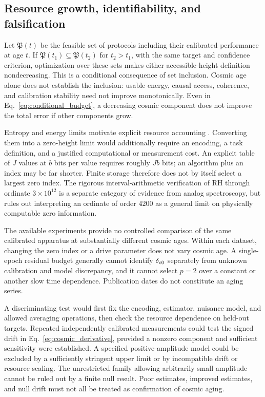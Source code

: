 \subsection{Resource growth, identifiability, and falsification}

Let $\mathfrak P(t)$ be the feasible set of protocols including their
calibrated performance at age $t$. If
$\mathfrak P(t_1)\subseteq\mathfrak P(t_2)$ for $t_2>t_1$, with the same
target and confidence criterion, optimization over these sets makes either
accessible-height definition nondecreasing. This is a conditional consequence
of set inclusion. Cosmic age alone does not establish the inclusion:
usable energy, causal access, coherence, and calibration stability need not
improve monotonically. Even in Eq.~\eqref{eq:conditional_budget}, a decreasing
cosmic component does not improve the total error if other components grow.

Entropy and energy limits motivate explicit resource accounting
\cite{Bekenstein1981,MargolusLevitin1998,Lloyd2002}. Converting them into a
zero-height limit would additionally require an encoding, a task definition,
and a justified computational or measurement cost. An explicit table of $J$
values at $b$ bits per value requires roughly $Jb$ bits; an algorithm plus an
index may be far shorter. Finite storage therefore does not by itself select
a largest zero index. The rigorous interval-arithmetic verification of RH
through ordinate $3\times10^{12}$ \cite{PlattTrudgian2021} is a separate
category of evidence from analog spectroscopy, but rules out interpreting
an ordinate of order $4200$ as a general limit on physically computable
zero information.

The available experiments provide no controlled comparison of the same
calibrated apparatus at substantially different cosmic ages. Within each
dataset, changing the zero index or a drive parameter does not vary cosmic
age. A single-epoch residual budget generally cannot identify
$\delta_{{\rm c}0}$ separately from unknown calibration and model discrepancy,
and it cannot select $p=2$ over a constant or another slow time dependence.
Publication dates do not constitute an aging series.

A discriminating test would first fix the encoding, estimator, nuisance
model, and allowed averaging operations, then check the resource dependence
on held-out targets. Repeated independently calibrated measurements could
test the signed drift in Eq.~\eqref{eq:cosmic_derivative}, provided a
nonzero component and sufficient sensitivity were established. A specified
positive-amplitude model could be excluded by a sufficiently stringent
upper limit or by incompatible drift or resource scaling. The unrestricted
family allowing arbitrarily small amplitude cannot be ruled out by a finite
null result. Poor estimates, improved estimates, and null drift must not all
be treated as confirmation of cosmic aging.
